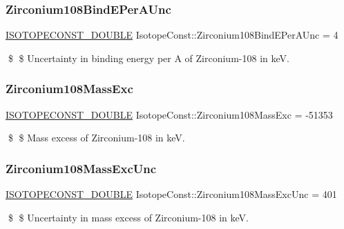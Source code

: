 \subsubsection{\texorpdfstring{Zirconium108\+Bind\+E\+Per\+A\+Unc}{Zirconium108BindEPerAUnc}}
{\footnotesize\ttfamily \mbox{\hyperlink{group___isotope_const-_macros_ga8f45a7272ce02c0b4c65c44636ed719a}{I\+S\+O\+T\+O\+P\+E\+C\+O\+N\+S\+T\+\_\+\+D\+O\+U\+B\+LE}} Isotope\+Const\+::\+Zirconium108\+Bind\+E\+Per\+A\+Unc = 4}

\$ \$ Uncertainty in binding energy per A of Zirconium-\/108 in keV. \mbox{\label{group___isotope_const-_zirconium-_zr108_ga99f7ed44cde2a4651048c36a1f326a17}} 
\subsubsection{\texorpdfstring{Zirconium108\+Mass\+Exc}{Zirconium108MassExc}}
{\footnotesize\ttfamily \mbox{\hyperlink{group___isotope_const-_macros_ga8f45a7272ce02c0b4c65c44636ed719a}{I\+S\+O\+T\+O\+P\+E\+C\+O\+N\+S\+T\+\_\+\+D\+O\+U\+B\+LE}} Isotope\+Const\+::\+Zirconium108\+Mass\+Exc = -\/51353}

\$ \$ Mass excess of Zirconium-\/108 in keV. \mbox{\label{group___isotope_const-_zirconium-_zr108_ga81f32de2d6b5694c0f964d71b7f744c8}} 
\subsubsection{\texorpdfstring{Zirconium108\+Mass\+Exc\+Unc}{Zirconium108MassExcUnc}}
{\footnotesize\ttfamily \mbox{\hyperlink{group___isotope_const-_macros_ga8f45a7272ce02c0b4c65c44636ed719a}{I\+S\+O\+T\+O\+P\+E\+C\+O\+N\+S\+T\+\_\+\+D\+O\+U\+B\+LE}} Isotope\+Const\+::\+Zirconium108\+Mass\+Exc\+Unc = 401}

\$ \$ Uncertainty in mass excess of Zirconium-\/108 in keV. \mbox{\label{group___isotope_const-_zirconium-_zr108_gaf2670345bce6830f4fa6a3d3ba0e9311}} 

